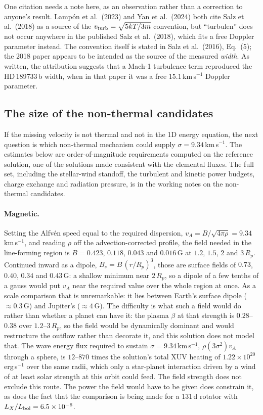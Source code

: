 \documentclass[english,a4paper]{my_memo}
\begin{document}
One citation needs a note here, as an observation rather than a correction to
anyone's result. Lamp\'on et al.\ (2023) and Yan et al.\ (2024) both cite
Salz et al.\ (2018) as a source of the $v_{\rm turb} = \sqrt{5kT/3m}$
convention, but ``turbulen'' does not occur anywhere in the published Salz et
al.\ (2018), which fits a free Doppler parameter instead. The convention
itself is stated in Salz et al.\ (2016), Eq.~(5); the 2018 paper appears to
be intended as the source of the measured \emph{width}. As written, the
attribution suggests that a Mach-1 turbulence term reproduced the
HD\,189733\,b width, when in that paper it was a free $15.1$\,km\,s$^{-1}$
Doppler parameter.

\subsection{The size of the non-thermal candidates}
\label{sec:candscale}

If the missing velocity is not thermal and not in the 1D energy equation, the
next question is which non-thermal mechanism could supply
$\sigma = 9.34$\,km\,s$^{-1}$. The estimates below are order-of-magnitude
requirements computed on the reference solution, one of the solutions made
consistent with the elemental fluxes. The full set, including the
stellar-wind standoff, the turbulent and kinetic power budgets, charge
exchange and radiation pressure, is in the working notes on the non-thermal
candidates.

\paragraph{Magnetic.}
Setting the Alfv\'en speed equal to the required dispersion,
$v_A = B/\sqrt{4\pi\rho} = 9.34$\,km\,s$^{-1}$, and reading $\rho$ off the
advection-corrected profile, the field needed in the line-forming region is
$B = 0.423$, $0.118$, $0.043$ and $0.016$\,G at $1.2$, $1.5$, $2$ and
$3\,R_p$. Continued inward as a dipole, $B_s = B\,(r/R_p)^3$, those are
surface fields of $0.73$, $0.40$, $0.34$ and $0.43$\,G: a shallow minimum
near $2\,R_p$, so a dipole of a few tenths of a gauss would put $v_A$ near
the required value over the whole region at once. As a scale comparison that
is unremarkable: it lies between Earth's surface dipole ($\approx 0.3$\,G)
and Jupiter's ($\approx 4$\,G). The difficulty is what such a field would do
rather than whether a planet can have it: the plasma $\beta$ at that strength
is $0.28$--$0.38$ over $1.2$--$3\,R_p$, so the field would be dynamically
dominant and would restructure the outflow rather than decorate it, and this
solution does not model that. The wave energy flux required to sustain
$\sigma = 9.34$\,km\,s$^{-1}$, $\rho(3\sigma^2)v_A$ through a sphere, is
$12$--$870$ times the solution's total XUV heating of
$1.22\times 10^{20}$\,erg\,s$^{-1}$ over the same radii, which only a
star-planet interaction driven by a wind of at least solar strength at this
orbit could feed. The field strength does not exclude this route. The power
the field would have to be given does constrain it, as does the fact that the
comparison is being made for a $131$\,d rotator with
$L_X/L_{\rm bol} = 6.5\times 10^{-6}$.
\end{document}
